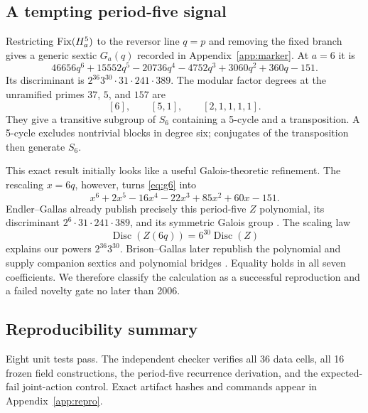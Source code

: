 \subsection{A tempting period-five signal}

Restricting $\operatorname{Fix}(H_a^5)$ to the reversor line $q=p$ and removing the fixed
branch gives a generic sextic $G_a(q)$ recorded in Appendix~\ref{app:marker}.
At $a=6$ it is
\begin{equation}\label{eq:g6}
 46656q^6+15552q^5-20736q^4-4752q^3+3060q^2+360q-151.
\end{equation}
Its discriminant is
$2^{36}3^{30}\cdot31\cdot241\cdot389$.  The modular factor degrees at the
unramified primes $37$, $5$, and $157$ are
\[
 [6],\qquad [5,1],\qquad [2,1,1,1,1].
\]
They give a transitive subgroup of $S_6$ containing a 5-cycle and a
transposition.  A 5-cycle excludes nontrivial blocks in degree six; conjugates
of the transposition then generate $S_6$.

This exact result initially looks like a useful Galois-theoretic refinement.
The rescaling $x=6q$, however, turns \eqref{eq:g6} into
\[
 x^6+2x^5-16x^4-22x^3+85x^2+60x-151.
\]
Endler--Gallas already publish precisely this period-five $Z$ polynomial, its
discriminant $2^6\cdot31\cdot241\cdot389$, and its symmetric Galois group
\citep{endler2006}.  The scaling law
\[
 \operatorname{Disc}(Z(6q))=6^{30}\operatorname{Disc}(Z)
\]
explains our powers $2^{36}3^{30}$.  Brison--Gallas later republish the
polynomial and supply companion sextics and polynomial bridges
\citep{brison2018}.  Equality holds in all seven coefficients.  We therefore
classify the calculation as a successful reproduction and a failed novelty
gate no later than 2006.

\subsection{Reproducibility summary}

Eight unit tests pass.  The independent checker verifies all 36 data cells,
all 16 frozen field constructions, the period-five recurrence derivation, and
the expected-fail joint-action control.  Exact artifact hashes and commands
appear in Appendix~\ref{app:repro}.

